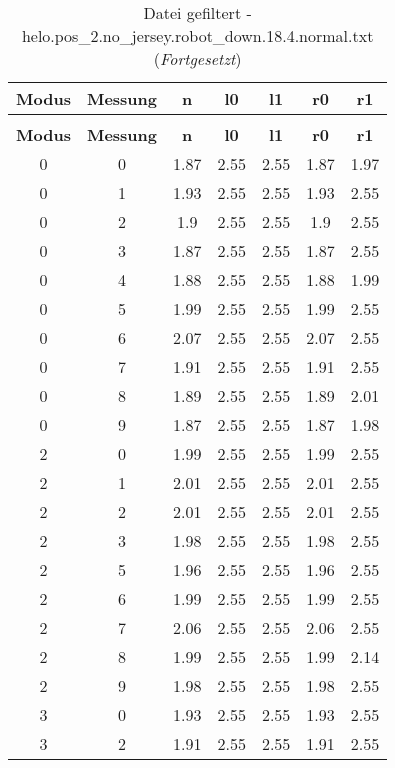 \begin{longtable}{|c|c||c||c|c||c|c|}
	\caption{Datei gefiltert - helo.pos\_2.no\_jersey.robot\_down.18.4.normal.txt} \label{tab:helo.pos-2.no-jersey.robot-down.18.4.normal.txt} \\ \hline
	\textbf{Modus} & \textbf{Messung} & \textbf{n} & \textbf{l0} & \textbf{l1} & \textbf{r0} & \textbf{r1}\\ \hline
	\endfirsthead
	\caption[]{Datei gefiltert - helo.pos\_2.no\_jersey.robot\_down.18.4.normal.txt (\emph{Fortgesetzt})} \\ \hline
	\textbf{Modus} & \textbf{Messung} & \textbf{n} & \textbf{l0} & \textbf{l1} & \textbf{r0} & \textbf{r1}\\ \hline
	\endhead
	0 & 0 & 1.87 & 2.55 & 2.55 & 1.87 & 1.97 \\ \hline
	0 & 1 & 1.93 & 2.55 & 2.55 & 1.93 & 2.55 \\ \hline
	0 & 2 & 1.9 & 2.55 & 2.55 & 1.9 & 2.55 \\ \hline
	0 & 3 & 1.87 & 2.55 & 2.55 & 1.87 & 2.55 \\ \hline
	0 & 4 & 1.88 & 2.55 & 2.55 & 1.88 & 1.99 \\ \hline
	0 & 5 & 1.99 & 2.55 & 2.55 & 1.99 & 2.55 \\ \hline
	0 & 6 & 2.07 & 2.55 & 2.55 & 2.07 & 2.55 \\ \hline
	0 & 7 & 1.91 & 2.55 & 2.55 & 1.91 & 2.55 \\ \hline
	0 & 8 & 1.89 & 2.55 & 2.55 & 1.89 & 2.01 \\ \hline
	0 & 9 & 1.87 & 2.55 & 2.55 & 1.87 & 1.98 \\ \hline
	2 & 0 & 1.99 & 2.55 & 2.55 & 1.99 & 2.55 \\ \hline
	2 & 1 & 2.01 & 2.55 & 2.55 & 2.01 & 2.55 \\ \hline
	2 & 2 & 2.01 & 2.55 & 2.55 & 2.01 & 2.55 \\ \hline
	2 & 3 & 1.98 & 2.55 & 2.55 & 1.98 & 2.55 \\ \hline
	2 & 5 & 1.96 & 2.55 & 2.55 & 1.96 & 2.55 \\ \hline
	2 & 6 & 1.99 & 2.55 & 2.55 & 1.99 & 2.55 \\ \hline
	2 & 7 & 2.06 & 2.55 & 2.55 & 2.06 & 2.55 \\ \hline
	2 & 8 & 1.99 & 2.55 & 2.55 & 1.99 & 2.14 \\ \hline
	2 & 9 & 1.98 & 2.55 & 2.55 & 1.98 & 2.55 \\ \hline
	3 & 0 & 1.93 & 2.55 & 2.55 & 1.93 & 2.55 \\ \hline
	3 & 2 & 1.91 & 2.55 & 2.55 & 1.91 & 2.55 \\ \hline

\end{longtable}

